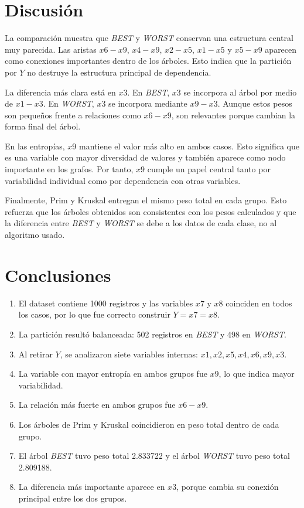 \documentclass[12pt,a4paper]{article}
\begin{document}
\section{Discusión}

La comparación muestra que \textit{BEST} y \textit{WORST} conservan una estructura central muy parecida. Las aristas \(x6-x9\), \(x4-x9\), \(x2-x5\), \(x1-x5\) y \(x5-x9\) aparecen como conexiones importantes dentro de los árboles. Esto indica que la partición por \(Y\) no destruye la estructura principal de dependencia.

La diferencia más clara está en \(x3\). En \textit{BEST}, \(x3\) se incorpora al árbol por medio de \(x1-x3\). En \textit{WORST}, \(x3\) se incorpora mediante \(x9-x3\). Aunque estos pesos son pequeños frente a relaciones como \(x6-x9\), son relevantes porque cambian la forma final del árbol.

En las entropías, \(x9\) mantiene el valor más alto en ambos casos. Esto significa que es una variable con mayor diversidad de valores y también aparece como nodo importante en los grafos. Por tanto, \(x9\) cumple un papel central tanto por variabilidad individual como por dependencia con otras variables.

Finalmente, Prim y Kruskal entregan el mismo peso total en cada grupo. Esto refuerza que los árboles obtenidos son consistentes con los pesos calculados y que la diferencia entre \textit{BEST} y \textit{WORST} se debe a los datos de cada clase, no al algoritmo usado.

\section{Conclusiones}

\begin{enumerate}
    \item El dataset contiene 1000 registros y las variables \(x7\) y \(x8\) coinciden en todos los casos, por lo que fue correcto construir \(Y=x7=x8\).
    \item La partición resultó balanceada: 502 registros en \textit{BEST} y 498 en \textit{WORST}.
    \item Al retirar \(Y\), se analizaron siete variables internas: \(x1,x2,x5,x4,x6,x9,x3\).
    \item La variable con mayor entropía en ambos grupos fue \(x9\), lo que indica mayor variabilidad.
    \item La relación más fuerte en ambos grupos fue \(x6-x9\).
    \item Los árboles de Prim y Kruskal coincidieron en peso total dentro de cada grupo.
    \item El árbol \textit{BEST} tuvo peso total 2.833722 y el árbol \textit{WORST} tuvo peso total 2.809188.
    \item La diferencia más importante aparece en \(x3\), porque cambia su conexión principal entre los dos grupos.
\end{enumerate}
\end{document}
